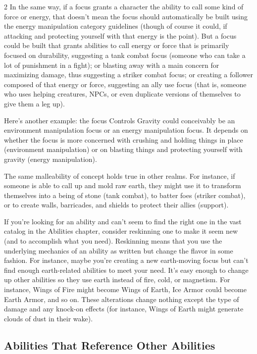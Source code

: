 \begin{multicols}{2}
In the same way, if a focus grants a character the ability to call some kind of force or energy, that doesn’t mean the focus should automatically be built using the energy manipulation category guidelines (though of course it could, if attacking and protecting yourself with that energy is the point). But a focus could be built that grants abilities to call energy or force that is primarily focused on durability, suggesting a tank combat focus (someone who can take a lot of punishment in a fight); or blasting away with a main concern for maximizing damage, thus suggesting a striker combat focus; or creating a follower composed of that energy or force, suggesting an ally use focus (that is, someone who uses helping creatures, NPCs, or even duplicate versions of themselves to give them a leg up).
 
Here’s another example: the focus Controls Gravity could conceivably be an environment manipulation focus or an energy manipulation focus. It depends on whether the focus is more concerned with crushing and holding things in place (environment manipulation) or on blasting things and protecting yourself with gravity (energy manipulation).

The same malleability of concept holds true in other realms. For instance, if someone is able to call up and mold raw earth, they might use it to transform themselves into a being of stone (tank combat), to batter foes (striker combat), or to create walls, barricades, and shields to protect their allies (support). 

If you’re looking for an ability and can’t seem to find the right one in the vast catalog in the Abilities chapter, consider reskinning one to make it seem new (and to accomplish what you need). Reskinning means that you use the underlying mechanics of an ability as written but change the flavor in some fashion. For instance, maybe you’re creating a new earth-moving focus but can’t find enough earth-related abilities to meet your need. It’s easy enough to change up other abilities so they use earth instead of fire, cold, or magnetism. For instance, Wings of Fire might become Wings of Earth, Ice Armor could become Earth Armor, and so on. These alterations change nothing except the type of damage and any knock-on effects (for instance, Wings of Earth might generate clouds of dust in their wake).

\subsection{Abilities That Reference Other Abilities}


\end{multicols}
